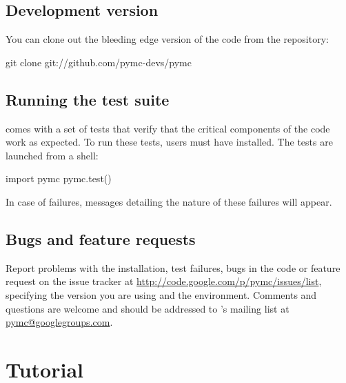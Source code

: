 \documentclass[]{jss}
\begin{document}

\subsection{Development version}
  \label{development-version}%


You can clone out the bleeding edge version of the code from the  \citep{git} 
repository:
\begin{CodeInput}
git clone git://github.com/pymc-devs/pymc
\end{CodeInput}



\subsection{Running the test suite}
  \label{running-the-test-suite}%


  comes with a set of tests that verify that the critical components
of the code work as expected. To run these tests, users must have 
installed. The tests are launched from a  shell:
\begin{CodeInput}
import pymc
pymc.test()
\end{CodeInput}

In case of failures, messages detailing the nature of these failures will
appear.



\subsection{Bugs and feature requests}
  \label{bugs-and-feature-requests}%


Report problems with the installation, test failures, bugs in the code or feature request
on the issue tracker at \href{http://code.google.com/p/pymc/issues/list}{http://code.google.com/p/pymc/issues/list},
specifying the version you are using and the environment. Comments and questions are welcome and should be
addressed to 's mailing list at \href{mailto:pymc@googlegroups.com}{pymc@googlegroups.com}.


\section[Tutorial]{Tutorial}
\label{chap:tutorial}
\end{document}
